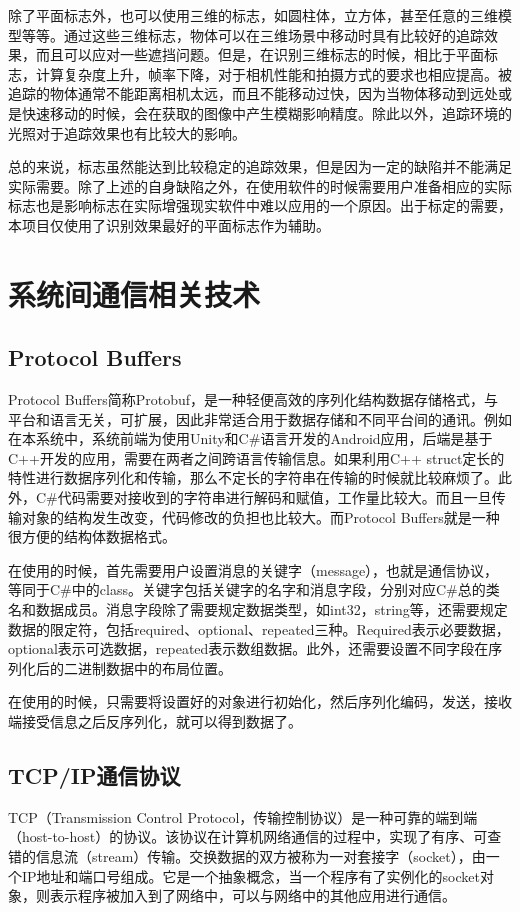 除了平面标志外，也可以使用三维的标志，如圆柱体，立方体，甚至任意的三维模型等等。通过这些三维标志，物体可以在三维场景中移动时具有比较好的追踪效果，而且可以应对一些遮挡问题。但是，在识别三维标志的时候，相比于平面标志，计算复杂度上升，帧率下降，对于相机性能和拍摄方式的要求也相应提高。被追踪的物体通常不能距离相机太远，而且不能移动过快，因为当物体移动到远处或是快速移动的时候，会在获取的图像中产生模糊影响精度。除此以外，追踪环境的光照对于追踪效果也有比较大的影响。

总的来说，标志虽然能达到比较稳定的追踪效果，但是因为一定的缺陷并不能满足实际需要。除了上述的自身缺陷之外，在使用软件的时候需要用户准备相应的实际标志也是影响标志在实际增强现实软件中难以应用的一个原因。出于标定的需要，本项目仅使用了识别效果最好的平面标志作为辅助。

\section{系统间通信相关技术}
\subsection{Protocol Buffers}
Protocol Buffers简称Protobuf，是一种轻便高效的序列化结构数据存储格式，与平台和语言无关，可扩展，因此非常适合用于数据存储和不同平台间的通讯。例如在本系统中，系统前端为使用Unity和C\#语言开发的Android应用，后端是基于C++开发的应用，需要在两者之间跨语言传输信息。如果利用C++ struct定长的特性进行数据序列化和传输，那么不定长的字符串在传输的时候就比较麻烦了。此外，C\#代码需要对接收到的字符串进行解码和赋值，工作量比较大。而且一旦传输对象的结构发生改变，代码修改的负担也比较大。而Protocol Buffers就是一种很方便的结构体数据格式。

在使用的时候，首先需要用户设置消息的关键字（message），也就是通信协议，等同于C\#中的class。关键字包括关键字的名字和消息字段，分别对应C\#总的类名和数据成员。消息字段除了需要规定数据类型，如int32，string等，还需要规定数据的限定符，包括required、optional、repeated三种。Required表示必要数据，optional表示可选数据，repeated表示数组数据。此外，还需要设置不同字段在序列化后的二进制数据中的布局位置。

在使用的时候，只需要将设置好的对象进行初始化，然后序列化编码，发送，接收端接受信息之后反序列化，就可以得到数据了。

\subsection{TCP/IP通信协议}
	TCP（Transmission Control Protocol，传输控制协议）是一种可靠的端到端（host-to-host）的协议。该协议在计算机网络通信的过程中，实现了有序、可查错的信息流（stream）传输。交换数据的双方被称为一对套接字（socket），由一个IP地址和端口号组成。它是一个抽象概念，当一个程序有了实例化的socket对象，则表示程序被加入到了网络中，可以与网络中的其他应用进行通信。
	
